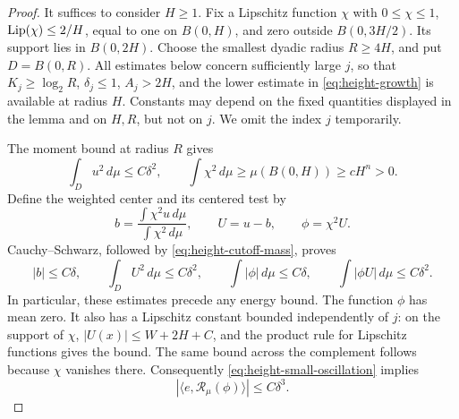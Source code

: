 \begin{proof}
It suffices to consider $H\ge1$.  Fix a Lipschitz function $\chi$ with
$0\le\chi\le1$, $\operatorname{Lip}(\chi)\le2/H$, equal to one on $B(0,H)$,
and zero outside $B(0,3H/2)$.  Its support lies in $B(0,2H)$.
Choose the smallest dyadic radius $R\ge4H$, and put $D=B(0,R)$.
All estimates below concern sufficiently large $j$, so that $K_j\ge\log_2R$,
$\delta_j\le1$, $A_j>2H$, and the lower estimate in
\eqref{eq:height-growth} is available at radius $H$.  Constants may depend
on the fixed quantities displayed in the lemma and on $H,R$, but not on $j$.
We omit the index $j$ temporarily.

The moment bound at radius $R$ gives
\begin{equation}
 \int_D u^2\,d\mu\le C\delta^2,
 \qquad
 \int\chi^2\,d\mu\ge\mu(B(0,H))\ge cH^n>0.
 \label{eq:height-cutoff-mass}
\end{equation}
Define the weighted center and its centered test by
\begin{equation}
 b=\frac{\int\chi^2u\,d\mu}{\int\chi^2\,d\mu},
 \qquad U=u-b,\qquad \phi=\chi^2U.
 \label{eq:height-centered-test}
\end{equation}
Cauchy--Schwarz, followed by \eqref{eq:height-cutoff-mass}, proves
\begin{equation}
 |b|\le C\delta,\qquad
 \int_DU^2\,d\mu\le C\delta^2,\qquad
 \int|\phi|\,d\mu\le C\delta,
 \qquad \int|\phi U|\,d\mu\le C\delta^2.
 \label{eq:height-centered-bounds}
\end{equation}
In particular, these estimates precede any energy bound.  The function
$\phi$ has mean zero.  It also has a Lipschitz constant bounded independently
of $j$: on the support of $\chi$,
$|U(x)|\le W+2H+C$, and the product rule for Lipschitz functions gives the
bound.  The same bound across the complement follows because $\chi$ vanishes
there.  Consequently \eqref{eq:height-small-oscillation} implies
\begin{equation}
 |\langle e,\mathcal R_\mu(\phi)\rangle|\le C\delta^3.
 \label{eq:height-tested-pairing}
\end{equation}


\end{proof}
